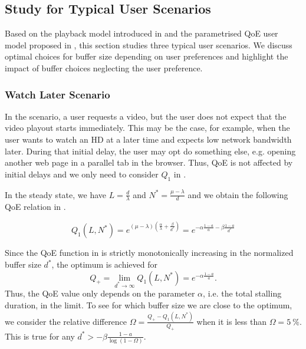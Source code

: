 \subsection{ Study for Typical User Scenarios}\label{sec:application:qoe_user_behaviour:typical_user_scenarios}
Based on the playback model introduced in  and the parametrised \gls{QoE} user model proposed in , this section studies three typical user scenarios.
We discuss optimal choices for buffer size depending on user preferences and highlight the impact of buffer choices neglecting the user preference.

\subsubsection*{Watch Later Scenario}\label{sec:application:qoe_user_behaviour:typical_user_scenarios:watch_later}
In the \watchLater scenario, a user requests a video, but the user does not expect that the video playout starts immediately. 
This may be the case, for example, when the user wants to watch an HD at a later time and expects low network bandwidth later. 
During that initial delay, the user may opt do something else, e.g. opening another web page in a parallel tab in the browser.
Thus, \gls{QoE} is not affected by initial delays and we only need to consider \(Q_1\) in .

In the steady state, we have \(L=\frac{d}{\lambda}\) and \(N^*=\frac{\mu-\lambda}{d}\) and we obtain the following QoE relation in . 

\begin{equation}
   Q_1(L,N^*) = e^{\left(\mu-\lambda\right)(\frac{\alpha}{\lambda} +\frac{\beta}{d^*})}
	 = e^{-\alpha \frac{1-a}{a} - \beta \frac{1-a}{d^*}}
\label{eq:application:qoe_user_behaviour:typical_user_scenarios:stalling_steady_state}
\end{equation}

Since the \gls{QoE} function in  is strictly monotonically increasing in the normalized buffer size \(d^*\), the optimum is achieved for 
\[Q_+=\lim\limits_{d^* \to \infty} Q_1(L,N^*)=e^{-\alpha \frac{1-a}{a}}.\]
Thus, the QoE value only depends on the parameter \(\alpha\), i.e. the total stalling duration, in the limit.
To see for which buffer size we are close to the optimum, we consider the relative difference \(\Omega = \frac{Q_+-Q_1(L,N^*)}{Q_+}\) when it is less than \(\Omega=\SI{5}{\percent}\).
This is true for any \(d^*> -\beta \frac{1-a}{\log\left(1-\Omega\right)}\). 

